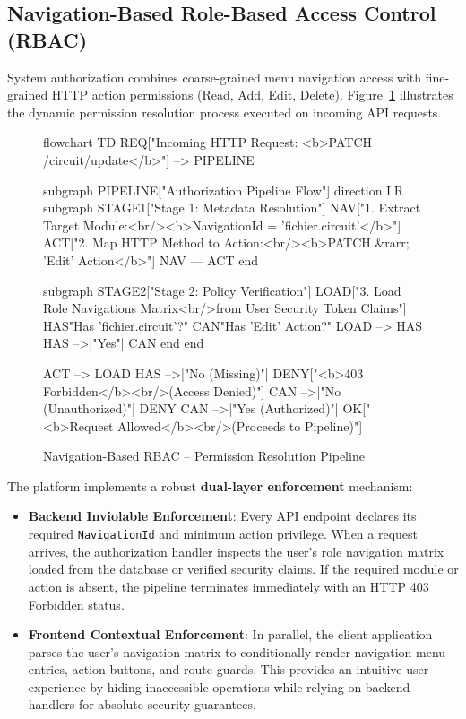 \subsection{Navigation-Based Role-Based Access Control (RBAC)}
\label{sec:rbac_model}

System authorization combines coarse-grained menu navigation access with fine-grained HTTP action permissions (Read, Add, Edit, Delete). Figure~\ref{fig:rbac_resolution} illustrates the dynamic permission resolution process executed on incoming API requests.

\begin{figure}[H]
  \centering
  \begin{mermaid}[width=0.98\textwidth]
flowchart TD
    REQ["Incoming HTTP Request: <b>PATCH /circuit/update</b>"] --> PIPELINE

    subgraph PIPELINE["Authorization Pipeline Flow"]
        direction LR
        subgraph STAGE1["Stage 1: Metadata Resolution"]
            NAV["1. Extract Target Module:<br/><b>NavigationId = 'fichier.circuit'</b>"]
            ACT["2. Map HTTP Method to Action:<br/><b>PATCH &rarr; 'Edit' Action</b>"]
            NAV --- ACT
        end

        subgraph STAGE2["Stage 2: Policy Verification"]
            LOAD["3. Load Role Navigations Matrix<br/>from User Security Token Claims"]
            HAS{"Has 'fichier.circuit'?"}
            CAN{"Has 'Edit' Action?"}
            LOAD --> HAS
            HAS -->|"Yes"| CAN
        end
    end

    ACT --> LOAD
    HAS -->|"No (Missing)"| DENY["<b>403 Forbidden</b><br/>(Access Denied)"]
    CAN -->|"No (Unauthorized)"| DENY
    CAN -->|"Yes (Authorized)"| OK["<b>Request Allowed</b><br/>(Proceeds to Pipeline)"]
  \end{mermaid}
  \caption{Navigation-Based RBAC -- Permission Resolution Pipeline}
  \label{fig:rbac_resolution}
\end{figure}

The platform implements a robust \textbf{dual-layer enforcement} mechanism:
\begin{itemize}
  \item \textbf{Backend Inviolable Enforcement}: Every API endpoint declares its required \texttt{NavigationId} and minimum action privilege. When a request arrives, the authorization handler inspects the user's role navigation matrix loaded from the database or verified security claims. If the required module or action is absent, the pipeline terminates immediately with an HTTP 403 Forbidden status.
  \item \textbf{Frontend Contextual Enforcement}: In parallel, the client application parses the user's navigation matrix to conditionally render navigation menu entries, action buttons, and route guards. This provides an intuitive user experience by hiding inaccessible operations while relying on backend handlers for absolute security guarantees.
\end{itemize}

